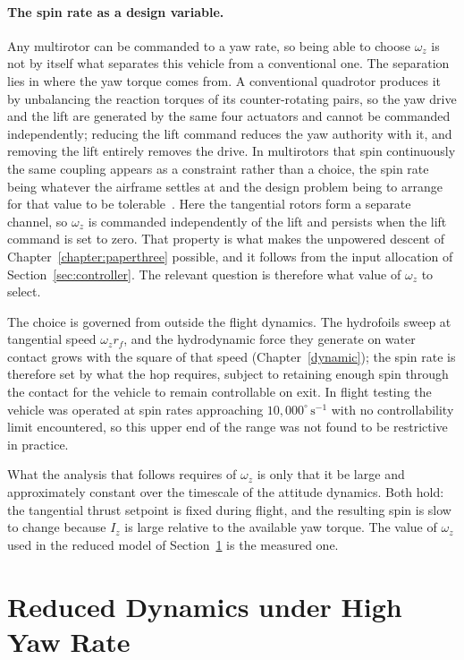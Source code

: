 \paragraph{The spin rate as a design variable.}
Any multirotor can be commanded to a yaw rate, so being able to choose
$\omega_z$ is not by itself what separates this vehicle from a conventional
one.  The separation lies in where the yaw torque comes from.  A conventional
quadrotor produces it by unbalancing the reaction torques of its
counter-rotating pairs, so the yaw drive and the lift are generated by the
same four actuators and cannot be commanded independently; reducing the lift
command reduces the yaw authority with it, and removing the lift entirely
removes the drive.  In multirotors that spin continuously the same coupling
appears as a constraint rather than a choice, the spin rate being whatever the
airframe settles at and the design problem being to arrange for that value to
be tolerable~\cite{mueller2016relaxed,bai2020splitflyer}.  Here the tangential
rotors form a separate channel, so $\omega_z$ is commanded independently of
the lift and persists when the lift command is set to zero.  That property is
what makes the unpowered descent of
Chapter~\ref{chapter:paperthree} possible, and it follows from the input
allocation of Section~\ref{sec:controller}.  The relevant question is
therefore what value of $\omega_z$ to select.

The choice is governed from outside the flight dynamics.  The hydrofoils
sweep at tangential speed $\omega_z r_f$, and the hydrodynamic force they
generate on water contact grows with the square of that speed
(Chapter~\ref{dynamic}); the spin rate is therefore set by what the hop
requires, subject to retaining enough spin through the contact for the vehicle
to remain controllable on exit.  In flight testing the vehicle was operated at
spin rates approaching $10{,}000^{\circ}\,\mathrm{s^{-1}}$ with no
controllability limit encountered, so this upper end of the range was not
found to be restrictive in practice.

What the analysis that follows requires of $\omega_z$ is only that it be large
and approximately constant over the timescale of the attitude dynamics.  Both
hold: the tangential thrust setpoint is fixed during flight, and the resulting
spin is slow to change because $I_z$ is large relative to the available yaw
torque.  The value of $\omega_z$ used in the reduced model of
Section~\ref{sec:reduced_dynamics} is the measured one.

\section{Reduced Dynamics under High Yaw Rate}
\label{sec:reduced_dynamics}

